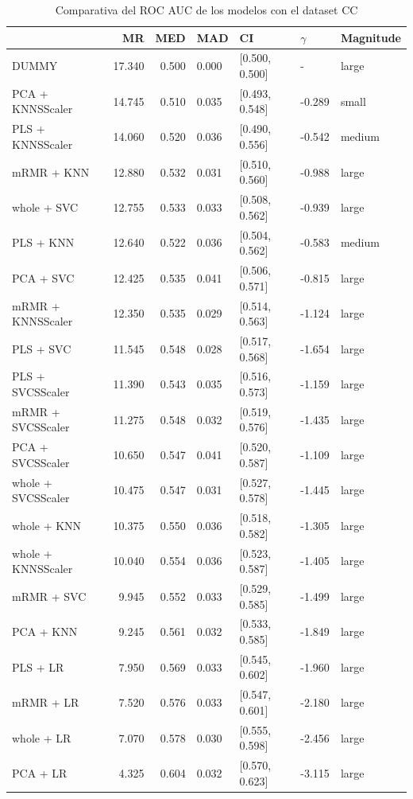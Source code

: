 \documentclass[a4paper,oneside,11pt,leqno]{article}
\begin{document}
	\begin{table}[h]
		\centering
		\begin{tabular}{lrrllll}
			\toprule
			{} &     MR &   MED &   MAD &              CI & $\gamma$ & Magnitude \\
			\midrule
			DUMMY              & 17.340 & 0.500 & 0.000 &  [0.500, 0.500] &         - &     large \\
			PCA + KNNSScaler   & 14.745 & 0.510 & 0.035 &  [0.493, 0.548] &    -0.289 &     small \\
			PLS + KNNSScaler   & 14.060 & 0.520 & 0.036 &  [0.490, 0.556] &    -0.542 &    medium \\
			mRMR + KNN         & 12.880 & 0.532 & 0.031 &  [0.510, 0.560] &    -0.988 &     large \\
			whole + SVC        & 12.755 & 0.533 & 0.033 &  [0.508, 0.562] &    -0.939 &     large \\
			PLS + KNN          & 12.640 & 0.522 & 0.036 &  [0.504, 0.562] &    -0.583 &    medium \\
			PCA + SVC          & 12.425 & 0.535 & 0.041 &  [0.506, 0.571] &    -0.815 &     large \\
			mRMR + KNNSScaler  & 12.350 & 0.535 & 0.029 &  [0.514, 0.563] &    -1.124 &     large \\
			PLS + SVC          & 11.545 & 0.548 & 0.028 &  [0.517, 0.568] &    -1.654 &     large \\
			PLS + SVCSScaler   & 11.390 & 0.543 & 0.035 &  [0.516, 0.573] &    -1.159 &     large \\
			mRMR + SVCSScaler  & 11.275 & 0.548 & 0.032 &  [0.519, 0.576] &    -1.435 &     large \\
			PCA + SVCSScaler   & 10.650 & 0.547 & 0.041 &  [0.520, 0.587] &    -1.109 &     large \\
			whole + SVCSScaler & 10.475 & 0.547 & 0.031 &  [0.527, 0.578] &    -1.445 &     large \\
			whole + KNN        & 10.375 & 0.550 & 0.036 &  [0.518, 0.582] &    -1.305 &     large \\
			whole + KNNSScaler & 10.040 & 0.554 & 0.036 &  [0.523, 0.587] &    -1.405 &     large \\
			mRMR + SVC         &  9.945 & 0.552 & 0.033 &  [0.529, 0.585] &    -1.499 &     large \\
			PCA + KNN          &  9.245 & 0.561 & 0.032 &  [0.533, 0.585] &    -1.849 &     large \\
			PLS + LR           &  7.950 & 0.569 & 0.033 &  [0.545, 0.602] &    -1.960 &     large \\
			mRMR + LR          &  7.520 & 0.576 & 0.033 &  [0.547, 0.601] &    -2.180 &     large \\
			whole + LR         &  7.070 & 0.578 & 0.030 &  [0.555, 0.598] &    -2.456 &     large \\
			PCA + LR           &  4.325 & 0.604 & 0.032 &  [0.570, 0.623] &    -3.115 &     large \\
			\bottomrule
		\end{tabular}
		\caption{Comparativa del ROC AUC de los modelos con el dataset CC}
		\label{tab:stat_results_cc}
	\end{table}
\end{document}
